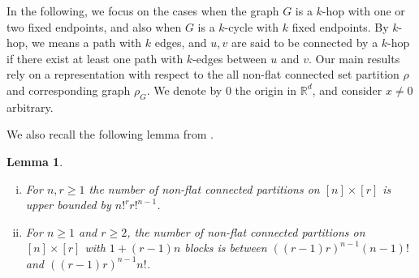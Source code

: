 \documentclass[12pt]{article}
\newcommand{\R}{\mathbb{R}}
\newtheorem{lemma}[prop]{Lemma}
\numberwithin{equation}{section}
\begin{document}
\medskip

In the following, we focus on the cases when the graph $G$ is a $k$-hop with one
or two fixed endpoints, and also when $G$ is a $k$-cycle with $k$ fixed endpoints.
By $k$-hop, we means a path with $k$ edges, and $u,v$ are said to be connected by a $k$-hop if there exist at least one path with $k$-edges between $u$ and $v$.
Our main results rely on a representation with respect to the all non-flat connected set partition $\rho$ and corresponding graph $\rho_G$.
 We denote by $0$ the origin in $\R^d$, and consider $x\ne 0$ arbitrary. 

 \medskip 

  We also recall the following lemma from \cite[Lemma~2.6]{LiuPrivault}.
 \begin{lemma}
   \label{numpartition}
   \begin{enumerate}[i)]
   \item
     For $n, r\geq 1$ the number of non-flat connected partitions on $[n]\times[r]$ is upper bounded by $n!^r r!^{n-1}$.
\item For $n\geq 1$ and $r\geq 2$, the number of non-flat connected partitions on $[n]\times[r]$ with $1+(r-1)n$ blocks is between $((r-1)r)^{n-1}(n-1)!$ and $((r-1)r)^{n-1}n!$.
   \end{enumerate}
 \end{lemma}
\end{document}
